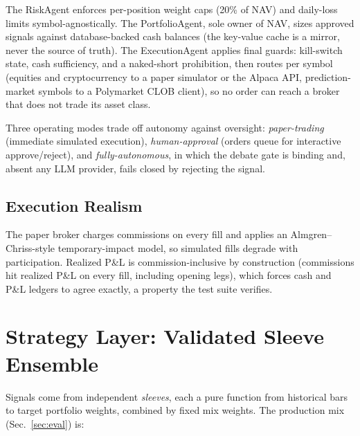 \documentclass[10pt,twocolumn]{IEEEtran}
\begin{document}
The RiskAgent enforces per-position weight caps (20\% of NAV) and daily-loss
limits symbol-agnostically. The PortfolioAgent, sole owner of NAV, sizes
approved signals against database-backed cash balances (the key-value cache
is a mirror, never the source of truth). The ExecutionAgent applies final
guards: kill-switch state, cash sufficiency, and a naked-short prohibition,
then routes per symbol (equities and cryptocurrency to a paper simulator
or the Alpaca API, prediction-market symbols to a Polymarket CLOB client),
so no order can reach a broker that does not trade its asset class.

Three operating modes trade off autonomy against oversight:
\emph{paper-trading} (immediate simulated execution),
\emph{human-approval} (orders queue for interactive approve/reject), and
\emph{fully-autonomous}, in which the debate gate is binding and, absent any
LLM provider, fails closed by rejecting the signal.

\subsection{Execution Realism}
The paper broker charges commissions on every fill and applies an
Almgren--Chriss-style \cite{almgren2001optimal} temporary-impact model, so
simulated fills degrade with participation. Realized P\&L is
commission-inclusive by construction (commissions hit realized P\&L on every
fill, including opening legs), which forces cash and P\&L ledgers to agree
exactly, a property the test suite verifies.

\section{Strategy Layer: Validated Sleeve Ensemble}
\label{sec:sleeves}

Signals come from independent \emph{sleeves}, each a pure function from
historical bars to target portfolio weights, combined by fixed mix weights.
The production mix (Sec.~\ref{sec:eval}) is:
\end{document}
